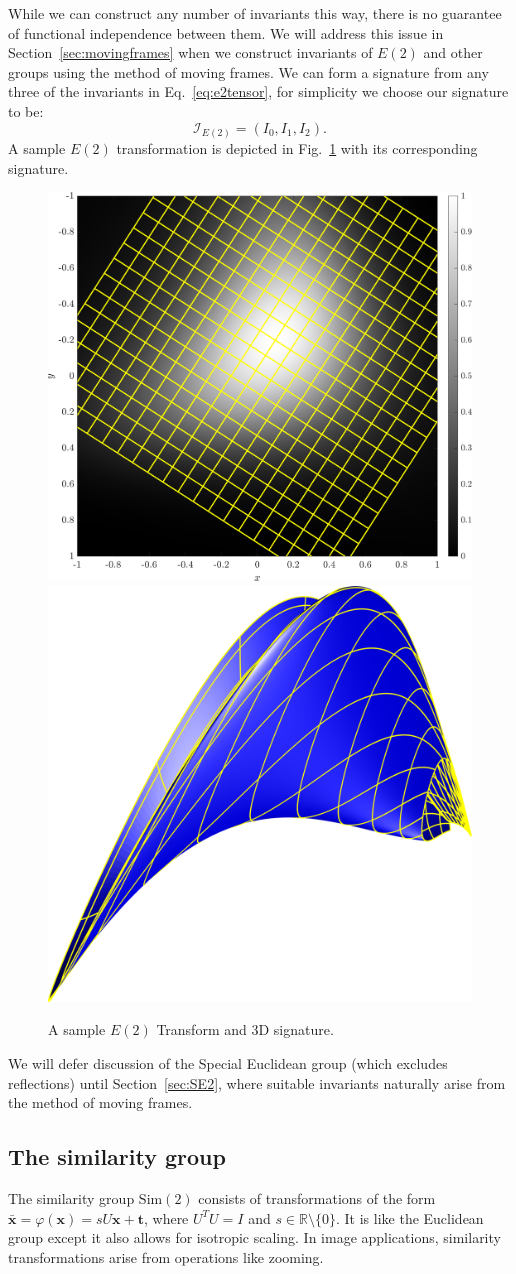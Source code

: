 \documentclass[review,onefignum,onetabnum]{siamonline190516}
\begin{document}
While we can construct any number of invariants this way, there is no
guarantee of functional independence between them. We will address this
issue in Section~\ref{sec:movingframes} when we construct invariants of
$E(2)$ and other groups using the method of moving frames. We can form a
signature from any three of the invariants in Eq.~\eqref{eq:e2tensor}, for simplicity we choose 
our signature to be:
\begin{equation}
    \label{eq:e2signature}
    \mathcal{I}_{E(2)} = (I_0, I_1, I_2) .
\end{equation}  
A sample $E(2)$ transformation is depicted in Fig.~\ref{fig:E2} with its corresponding
signature.
\begin{figure}
\centering
\includegraphics[width=.45\textwidth]{Figs/f_transformed_E2.png}
\includegraphics[width=.45\textwidth]{Figs/E2_signature.png}
\caption{A sample $E(2)$ Transform and 3D signature.}
\label{fig:E2}
\end{figure}
We will defer discussion of the Special Euclidean group (which excludes
reflections) until Section~\ref{sec:SE2}, where suitable invariants naturally arise
from the method of moving frames.

\subsection{The similarity group}
\label{sec:Sim2}
The similarity group $\text{Sim}(2)$ consists of transformations of the form
$\bar{\mathbf{x}} = \varphi(\mathbf{x}) = sU\mathbf{x} + \mathbf{t}$, where $U^TU = I$ and $s
\in \mathbb{R}\setminus\{0\}$. It is like the Euclidean group except it
also allows for isotropic scaling. In image applications, similarity
transformations arise from operations like zooming.
\end{document}
